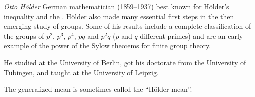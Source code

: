 \documentclass[12pt]{article}
\begin{document}
\emph{Otto H\"older} German mathematician (1859--1937) best known for H\"older's inequality and the .  H\"older also made many essential first steps in the then emerging study of groups.  Some of his results include a complete classification of the groups of  $p^2,\,p^3,\,p^4$, $pq$ and $p^2q$ ($p$ and $q$ different primes) and are an early example of the power of the Sylow theorems for finite group theory.

He studied at the University of Berlin, got his doctorate from the University of T\"ubingen, and taught at the University of Leipzig.

The generalized mean is sometimes called the ``H\"older mean''.
\end{document}
